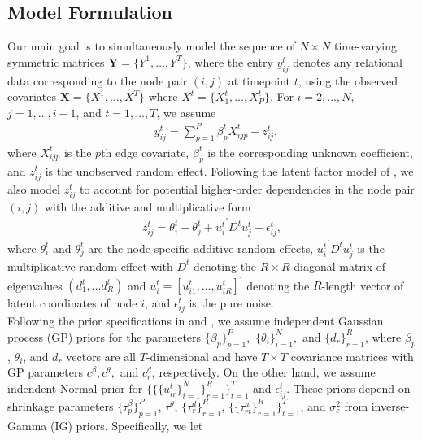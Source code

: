 \documentclass[a4paper]{article}
\begin{document}
\subsection{Model Formulation}\label{subsec: Model formulation}
Our main goal is to simultaneously model the sequence of $N \times N$ time-varying symmetric matrices $\mathbf{Y} = \{Y^1,\ldots,Y^T\}$, where the entry $y^t_{ij}$ denotes any relational data corresponding to the node pair $(i, j)$ at timepoint $t$, using the observed covariates $\mathbf{X} = \{X^1,\ldots,X^T\}$ where $X^t = \{X^t_1, \ldots, X^t_P\}$. For $i=2,\ldots,N$,$j=1,\ldots,i-1$, and $t = 1,\ldots,T$, we assume
\begin{equation}
\begin{aligned}
&y^t_{ij}=\sum\limits_{p=1}^P \beta^t_{p}X^t_{ijp}+z^t_{ij},
\end{aligned}
\end{equation}
where $X^t_{ijp}$ is the $p${th} edge covariate, $\beta^t_{p}$ is the corresponding unknown coefficient, and $z^t_{ij}$ is the unobserved random effect. Following the latent factor model of \cite{minhas2016inferential}, we also model $z^t_{ij}$ to account for potential higher-order dependencies in the node pair $(i, j)$ with the additive and multiplicative form
\begin{equation}
\begin{aligned}
z^t_{ij} = \theta^t_{i}+\theta^t_{j}+{{u^t_{i}}^\prime D^{t} u^t_{j}}+\epsilon^t_{ij},
\end{aligned}
\end{equation}
where $\theta^t_{i}$ and $\theta^t_{j}$ are the node-specific additive random effects, ${{u^t_{i}}^\prime D^{t} u^t_{j}}$ is the multiplicative random effect with $D^{t}$ denoting the $R\times R$ diagonal matrix of eigenvalues $(d^t_1,\ldots d^t_R)$ and $u^t_{i}=[u^t_{i1},\ldots,u^t_{iR}]^\prime$ denoting the $R$-length vector of latent coordinates of node $i$, and $\epsilon^t_{ij}$ is the pure noise.\\ \newline
Following the prior specifications in \cite{bhattacharya2011sparse} and \cite{durante2013nonparametric}, we assume independent Gaussian process (GP) priors for the parameters $\{\beta_{p}\}_{p=1}^P,$ $\{\theta_{i}\}_{i=1}^N,$ and  $\{d_{r}\}_{r=1}^R$, where $\beta_{p}$, $\theta_{i}$, and $d_r$ vectors are all $T$-dimensional and have $T\times T$ covariance matrices with GP parameters $c^\beta, c^\theta,$ and  $c_r^d$, respectively. On the other hand, we assume indendent Normal prior for $\{\{\{u^t_{ir}\}_{i=1}^N\}_{r=1}^R\}_{t=1}^T$ and $\epsilon^t_{ij}$. These priors depend on shrinkage parameters $\{\tau^{\beta}_p\}_{p=1}^P$, $\tau^{\theta}$, $\{\tau^{d}_r\}_{r=1}^R$, $\{\{\tau^{u}_{rt}\}_{r=1}^R\}_{t=1}^T$, and $\sigma_e^2$ from inverse-Gamma (IG) priors. Specifically, we let 
\end{document}
